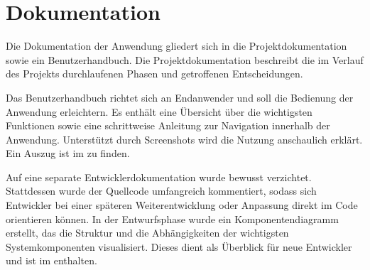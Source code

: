 \section{Dokumentation}
\label{sec:Dokumentation}
	Die Dokumentation der Anwendung gliedert sich in die Projektdokumentation sowie ein Benutzerhandbuch.
	Die Projektdokumentation beschreibt die im Verlauf des Projekts durchlaufenen Phasen und getroffenen Entscheidungen.

	Das Benutzerhandbuch richtet sich an Endanwender und soll die Bedienung der Anwendung erleichtern.
	Es enthält eine Übersicht über die wichtigsten Funktionen sowie eine schrittweise Anleitung zur Navigation innerhalb der Anwendung.
	Unterstützt durch Screenshots wird die Nutzung anschaulich erklärt.
	Ein Auszug ist im  zu finden.

	Auf eine separate Entwicklerdokumentation wurde bewusst verzichtet.
	Stattdessen wurde der Quellcode umfangreich kommentiert, sodass sich Entwickler bei einer späteren Weiterentwicklung
	oder Anpassung direkt im Code orientieren können. In der Entwurfsphase wurde ein Komponentendiagramm erstellt,
	das die Struktur und die Abhängigkeiten der wichtigsten Systemkomponenten visualisiert.
	Dieses dient als Überblick für neue Entwickler und ist im  enthalten.
